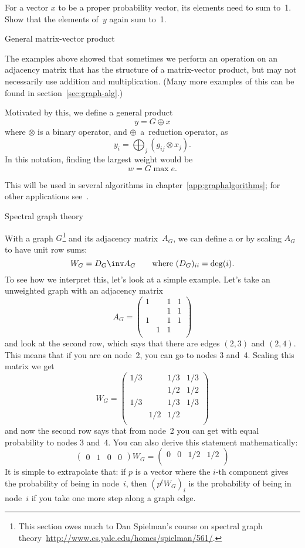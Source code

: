 \begin{exercise}
For a vector $x$ to be a proper probability vector, its elements
need to sum to~1. Show that the elements of~$y$ again sum to~1.
\end{exercise}

 {General matrix-vector product}

The examples above showed that sometimes we perform an operation
on an adjacency matrix that has the structure of a matrix-vector product,
but may not necessarily use addition and multiplication. (Many more examples 
of this can be found in section~\ref{sec:graph-alg}.)

Motivated by this, we define a general product
\[ y = G \mathop{\oplus\cdot_\otimes} x \]
where $\otimes$ is a binary operator, and $\oplus$~a~reduction operator,
as
\[ y_i = \bigoplus_j (g_{ij} \otimes x_j ). \]
In this notation, finding the largest weight would be
\[ w= G\mathop{\max\cdot_\times} e. \]

This will be used in several algorithms in chapter~\ref{app:graphalgorithms};
for other applications see~\cite{Kung:pegasus2009}.

 {Spectral graph theory}
\label{app:fiedler}

With a graph $G$\footnote{This section owes much to Dan Spielman's course
on spectral graph theory~\url{http://www.cs.yale.edu/homes/spielman/561/}.}
and its adjacency matrix~$A_G$, we can define a
 or  by scaling
$A_G$ to have unit row sums:
\[ W_G = D_G\inv A_G\qquad \hbox{where $(D_G)_{ii}=\deg(i)$}. \]
To see how we interpret this, let's look at a simple example.
Let's take an unweighted graph with an adjacency matrix
\[
A_G = \begin{pmatrix}
1& &1&1\\
 & &1&1\\
1& &1&1\\
 &1&1& \\
\end{pmatrix}
\]
and look at the second row, which says that there are edges $(2,3)$ 
and $(2,4)$. This means that if you are on node~2, you can go 
to nodes 3 and~4. Scaling this matrix we get
\[
W_G = \begin{pmatrix}
1/3&   &1/3&1/3\\
   &   &1/2&1/2\\
1/3&   &1/3&1/3\\
   &1/2&1/2&   \\
\end{pmatrix}
\]
and now the second row says that from node~2 you can get
with equal probability to nodes 3 and~4.
You can also derive this statement mathematically:
\[
\begin{pmatrix}
0&1&0&0
\end{pmatrix} W_G =
\begin{pmatrix}
  0&  0&1/2&1/2\\
\end{pmatrix}
\]
It is simple to extrapolate that: if $p$ is a vector where the $i$-th
component gives the probability of being in node~$i$, then $(p^tW_G)_i$
is the probability of being in node~$i$ if you take one more
step along a graph edge.

